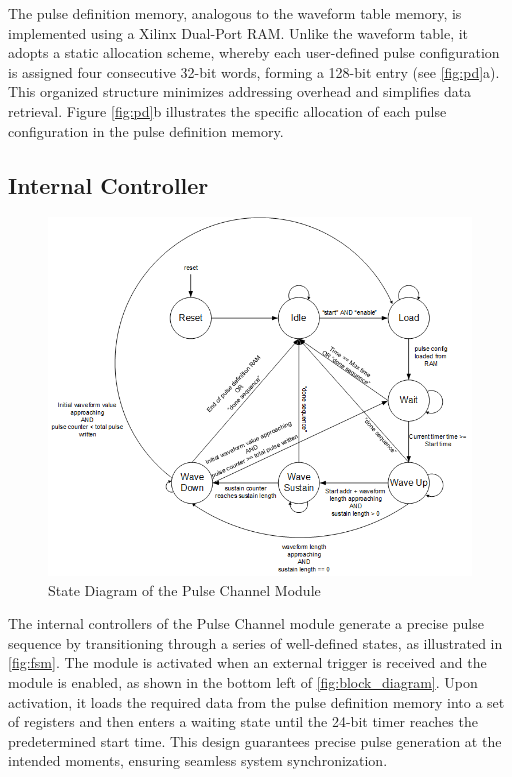 The pulse definition memory, analogous to the waveform table memory, is implemented using a Xilinx Dual-Port RAM. Unlike the waveform table, it adopts a static allocation scheme, whereby each user-defined pulse configuration is assigned four consecutive 32-bit words, forming a 128-bit entry (see \autoref{fig:pd}a). This organized structure minimizes addressing overhead and simplifies data retrieval. Figure \autoref{fig:pd}b illustrates the specific allocation of each pulse configuration in the pulse definition memory.

\subsection{Internal Controller}

\begin{figure}[htbp]
    \setlength{\abovecaptionskip}{0pt}    %
    \setlength{\belowcaptionskip}{0pt}    %
    \centering
    \includegraphics[width=1\linewidth]{figures/3.4.png}
    \caption{State Diagram of the Pulse Channel Module}
    \label{fig:fsm}
\end{figure}


The internal controllers of the Pulse Channel module generate a precise pulse sequence by transitioning through a series of well-defined states, as illustrated in \autoref{fig:fsm}. The module is activated when an external trigger is received and the module is enabled, as shown in the bottom left of \autoref{fig:block_diagram}. Upon activation, it loads the required data from the pulse definition memory into a set of registers and then enters a waiting state until the 24-bit timer reaches the predetermined start time. This design guarantees precise pulse generation at the intended moments, ensuring seamless system synchronization.

